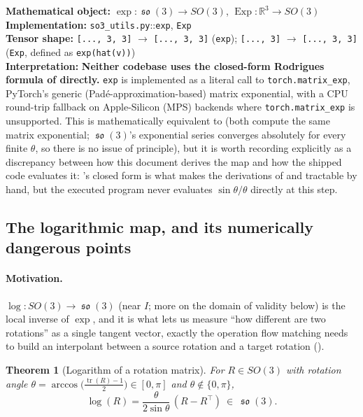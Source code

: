 \documentclass[11pt,a4paper]{report}
\newtheorem{theorem}{Theorem}[chapter]
\theoremstyle{definition}
\theoremstyle{remark}
\DeclareMathOperator{\Exp}{Exp}
\DeclareMathOperator{\so}{\mathfrak{so}}
\DeclareMathOperator{\tr}{tr}
\newcommand{\RR}{\mathbb R}
\newcommand{\file}[1]{\texttt{#1}}
\newcommand{\pyfunc}[1]{\texttt{#1}}
\newcommand{\shape}[1]{\texttt{[#1]}}
\begin{document}
\begin{codebox}
\textbf{Mathematical object:} $\exp:\so(3)\to SO(3)$, $\Exp:\RR^3\to SO(3)$ \\
\textbf{Implementation:} \file{so3\_utils.py}::\pyfunc{exp}, \pyfunc{Exp} \\
\textbf{Tensor shape:} \shape{..., 3, 3} $\to$ \shape{..., 3, 3} (\pyfunc{exp}); \shape{..., 3} $\to$ \shape{..., 3, 3} (\pyfunc{Exp}, defined as \texttt{exp(hat(v))}) \\
\textbf{Interpretation:} \textbf{Neither codebase uses the closed-form
Rodrigues formula of  directly.} \pyfunc{exp} is
implemented as a literal call to \texttt{torch.matrix\_exp}, PyTorch's
generic (Pad\'e-approximation-based) matrix exponential, with a CPU
round-trip fallback on Apple-Silicon (MPS) backends where
\texttt{torch.matrix\_exp} is unsupported. This is mathematically equivalent
to  (both compute the same matrix exponential;
$\so(3)$'s exponential series converges absolutely for every finite
$\theta$, so there is no issue of principle), but it is worth recording
explicitly as a discrepancy between how this document derives the map and
how the shipped code evaluates it: 's closed
form is what makes the derivations of  and
 tractable by hand, but the
executed program never evaluates $\sin\theta/\theta$ directly at this step.
\end{codebox}

\subsection{The logarithmic map, and its numerically dangerous points}
\label{sec:so3-log-scratch}

\paragraph{Motivation.} $\log:SO(3)\to\so(3)$ (near $I$; more on the
domain of validity below) is the local inverse of $\exp$, and it is what
lets us measure ``how different are two rotations'' as a single tangent
vector, exactly the operation flow matching needs to build an interpolant
between a source rotation and a target rotation
().

\begin{theorem}[Logarithm of a rotation matrix]
\label{thm:so3-log-scratch}
For $R\in SO(3)$ with rotation angle $\theta=\arccos\bigl(\tfrac{\tr(R)-1}2\bigr)\in[0,\pi]$
and $\theta\notin\{0,\pi\}$,
\[
\log(R) = \frac{\theta}{2\sin\theta}\,(R-R^\top)\ \in\ \so(3) .
\]
\end{theorem}
\end{document}

